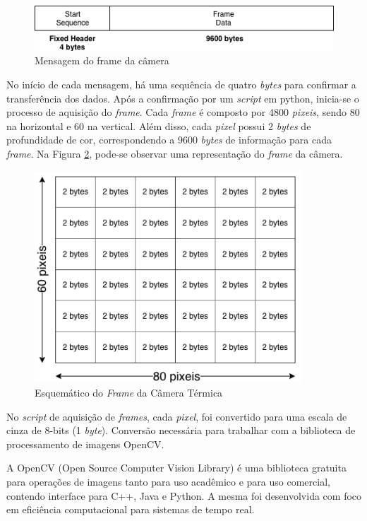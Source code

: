 		\begin{figure}[!ht]
		   \centering
		   \includegraphics[width=14cm]{Figures/frame_msg.png}
		   \caption{Mensagem do frame da câmera}
		   \label{fig:framemsg}
		\end{figure}
	
	    No início de cada mensagem, há uma sequência de quatro \textit{bytes} para confirmar a transferência dos dados. Após a confirmação por um \textit{script} em python, inicia-se o processo de aquisição do \textit{frame}. Cada \textit{frame} é composto por 4800 \textit{pixeis}, sendo 80 na horizontal e 60 na vertical. Além disso, cada \textit{pixel} possui 2 \textit{bytes} de profundidade de cor, correspondendo a 9600 \textit{bytes} de informação para cada \textit{frame}. Na Figura \ref{fig:frame_esque}, pode-se observar uma representação do \textit{frame} da câmera.
	    
	
		\begin{figure}[!ht]
		   \centering
		   \includegraphics[width=10cm]{Figures/frame_esque.png}
		   \caption{Esquemático do \textit{Frame} da Câmera Térmica}
		   \label{fig:frame_esque}
		\end{figure}
		
		No \textit{script} de aquisição de \textit{frames}, cada \textit{pixel}, foi convertido para uma escala de cinza de 8-bits (1 \textit{byte}). Conversão necessária para trabalhar com a biblioteca de processamento de imagens OpenCV.
		    
		A OpenCV (Open Source Computer Vision Library) é uma biblioteca gratuita para operações de imagens tanto para uso acadêmico e para uso comercial, contendo interface para C++, Java e Python. A mesma foi desenvolvida com foco em eficiência computacional para sistemas de tempo real.


